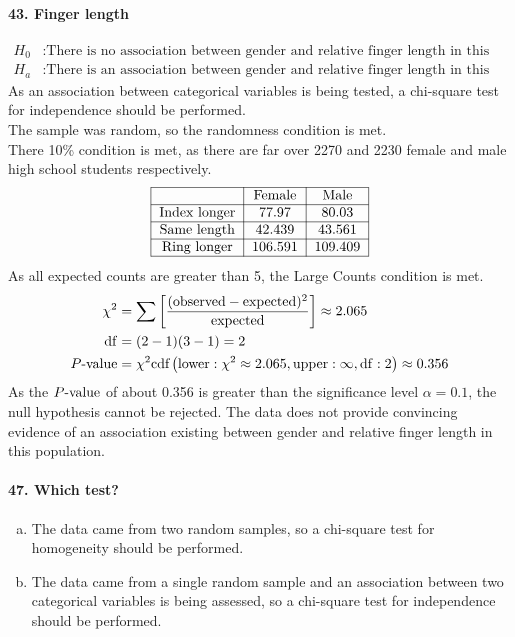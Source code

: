 \documentclass[../Homework]{subfiles}
\begin{document}
		\paragraph{43. Finger length}
			\begin{align*}
				H_0&: \text{There is no association between gender and relative finger length in this population.} \\
				H_a&: \text{There is an association between gender and relative finger length in this population.}
			\end{align*}
			As an association between categorical variables is being tested, a chi-square test for independence should be performed. \\
			The sample was random, so the randomness condition is met. \\
			There 10\% condition is met, as there are far over 2270 and 2230 female and male high school students respectively.
			\[\begin{tabular}{|c|c|c|}\hline
				& Female & Male \\\hline
				Index longer & 77.97 & 80.03 \\\hline
				Same length & 42.439 & 43.561 \\\hline
				Ring longer & 106.591 & 109.409 \\\hline
			\end{tabular}\]
			As all expected counts are greater than 5, the Large Counts condition is met.
			\begin{align*}
				\chi^2 &= \sum\left[\mathrm{\frac{(observed - expected)^2}{expected}}\right] \approx 2.065 \\
				\operatorname{df} &= (2 - 1)(3 - 1) = 2 \\
				P\text{-value} &= \chi^2\text{cdf}\left(\operatorname{lower}: \chi^2 \approx 2.065, \operatorname{upper}: \infty, \operatorname{df}: 2\right) \approx 0.356
			\end{align*}
			As the $P\text{-value}$ of about 0.356 is greater than the significance level $\alpha = 0.1$, the null hypothesis cannot be rejected. The data does not provide convincing evidence of an association existing between gender and relative finger length in this population.
		\paragraph{47. Which test?}
			\begin{enumerate}[a.]
				\item
					The data came from two random samples, so a chi-square test for homogeneity should be performed.
				\item
					The data came from a single random sample and an association between two categorical variables is being assessed, so a chi-square test for independence should be performed.
			\end{enumerate}
\end{document}
